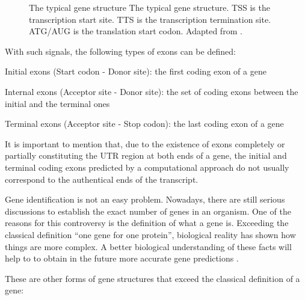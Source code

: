 \begin{figure}[t!]
\begin{center}
\setlength{\fboxsep}{0pt}
          {The typical gene structure}%
          {The typical gene structure.}%
          {TSS is the transcription start site. TTS is the transcription termination site. 
           ATG/AUG is the translation start codon. Adapted from \citet{zhang:2002a}.}
\end{center}
\end{figure}

With such signals, the following types of exons can be defined:

\begin{menumerate}
\item
Initial exons (Start codon - Donor site):   
the first coding exon of a gene
\item
Internal exons (Acceptor site - Donor site):  
the set of coding exons between the initial and the terminal ones
\item
Terminal exons (Acceptor site - Stop codon):  
the last coding exon of a gene
\end{menumerate}

It is important to mention that, due to the existence of exons completely or partially constituting
the UTR region at both ends of a gene, the initial and terminal coding exons predicted by a 
computational approach do not usually correspond to the authentical ends of the transcript.


Gene identification is not an easy problem. Nowadays, there are still serious
discussions to establish the exact number of genes in an organism. One of the
reasons for this controversy is the definition of what a gene is. Exceeding the
classical definition ``one gene for one protein'', biological reality has shown how things
are more complex. A better biological understanding of these facts will help to
to obtain in the future more accurate gene predictions \citep{pennisi:2003a}. 

These are other forms of gene structures that exceed the classical definition of a gene:

